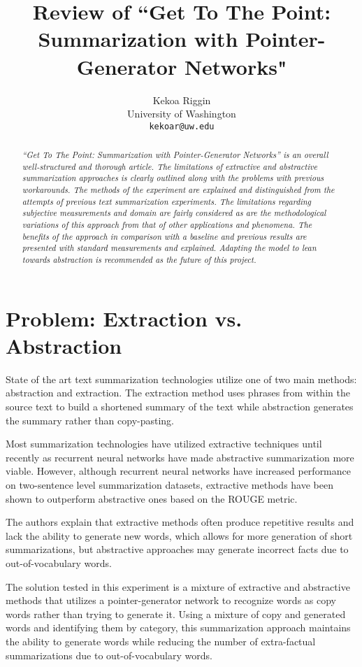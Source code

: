 \documentclass[11pt]{article}
\title{Review of ``Get To The Point: Summarization with Pointer-Generator Networks"}
\author{Kekoa Riggin \\
  University of Washington\\
  {\tt kekoar@uw.edu} \\}
\date{}
\begin{document}
\maketitle
\begin{abstract}

\textit{``Get To The Point: Summarization with Pointer-Generator Networks” is an overall well-structured and thorough article.  The limitations of extractive and abstractive summarization approaches is clearly outlined along with the problems with previous workarounds. The methods of the experiment are explained and distinguished from the attempts of previous text summarization experiments. The limitations regarding subjective measurements and domain are fairly considered as are the methodological variations of this approach from that of other applications and phenomena. The benefits of the approach in comparison with a baseline and previous results are presented with standard measurements and explained. Adapting the model to lean towards abstraction is recommended as the future of this project.}

\end{abstract}

\section{Problem: Extraction vs. Abstraction}

State of the art text summarization technologies utilize one of two main methods: abstraction and extraction. The extraction method uses phrases from within the source text to build a shortened summary of the text while abstraction generates the summary rather than copy-pasting. 

Most summarization technologies have utilized extractive techniques until recently as recurrent neural networks have made abstractive summarization more viable. However, although recurrent neural networks have increased performance on two-sentence level summarization datasets, extractive methods have been shown to outperform abstractive ones based on the ROUGE metric. 

The authors explain that extractive methods often produce repetitive results and lack the ability to generate new words, which allows for more generation of short summarizations, but abstractive approaches may generate incorrect facts due to out-of-vocabulary words.

The solution tested in this experiment is a mixture of extractive and abstractive methods that utilizes a pointer-generator network to recognize words as copy words rather than trying to generate it. Using a mixture of copy and generated words and identifying them by category, this summarization approach maintains the ability to generate words while reducing the number of extra-factual summarizations due to out-of-vocabulary words.  
\end{document}
